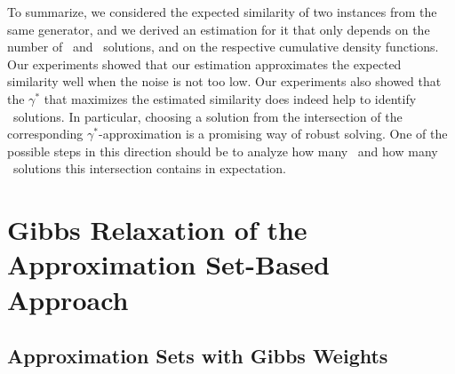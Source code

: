 To summarize, we considered the expected similarity of two instances from the
same generator, and we derived an estimation for it that only depends on the
number of \good\ and \bad\ solutions, and on the respective cumulative density
functions. Our experiments showed that our estimation approximates the expected
similarity well when the noise is not too low. 
%
Our experiments also showed that the $\gamma^*$ that maximizes the estimated
similarity does indeed help to identify \good\ solutions. In particular,
choosing a solution from the intersection of the corresponding
$\gamma^*$-approximation is a promising way of robust solving. One of the
possible steps in this direction should be to analyze how many \good\ and how
many \bad\ solutions this intersection contains in expectation.

\section{Gibbs Relaxation of the Approximation Set-Based Approach}
\label{sec:gibbs_relaxation_of_sim}

\subsection{Approximation Sets with Gibbs Weights}
\label{sec:gibbs_relaxation_of_sim_weights}

